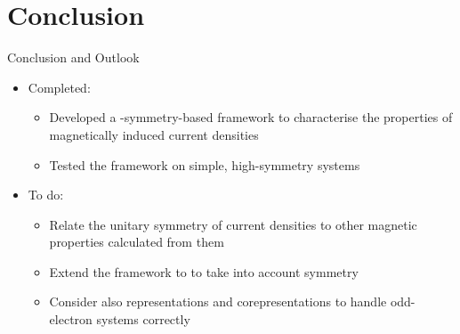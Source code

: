 \section{Conclusion}
\begin{frame}{Conclusion and Outlook}
  \begin{itemize}
    \item Completed:
    \begin{itemize}
      \item Developed a -symmetry-based framework to characterise the  properties of magnetically induced current densities
      \item Tested the framework on simple, high-symmetry systems
    \end{itemize}

    \item To do:
    \begin{itemize}
      \item Relate the unitary symmetry of current densities to other magnetic properties calculated from them
      \item Extend the framework to  to take into account  symmetry
      \item Consider also  representations and corepresentations to handle odd-electron systems correctly
    \end{itemize}
  \end{itemize}
\end{frame}


